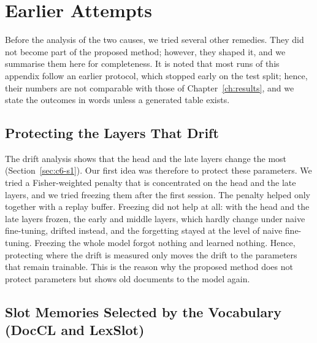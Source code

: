 \chapter{Earlier Attempts}
\label{app:earlier}

Before the analysis of the two causes, we tried several other remedies. They did not become
part of the proposed method; however, they shaped it, and we summarise them here for
completeness. It is noted that most runs of this appendix follow an earlier protocol,
which stopped early on the test split; hence, their numbers are not comparable with those
of Chapter~\ref{ch:results}, and we state the outcomes in words unless a generated table
exists.

\section{Protecting the Layers That Drift}
\label{app:earlier-protect}

The drift analysis shows that the head and the late layers change the most
(Section~\ref{sec:c6-s1}). Our first idea was therefore to protect these parameters. We
tried a Fisher-weighted penalty that is concentrated on the head and the late layers, and
we tried freezing them after the first session. The penalty helped only together with a
replay buffer. Freezing did not help at all: with the head and the late layers frozen, the
early and middle layers, which hardly change under naive fine-tuning, drifted instead, and
the forgetting stayed at the level of naive fine-tuning. Freezing the whole model forgot
nothing and learned nothing. Hence, protecting where the drift is measured only moves the
drift to the parameters that remain trainable. This is the reason why the proposed method
does not protect parameters but shows old documents to the model again.

\section{Slot Memories Selected by the Vocabulary (DocCL and LexSlot)}
\label{app:earlier-lexslot}

